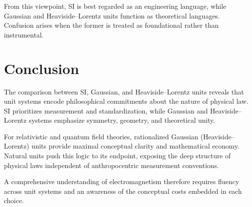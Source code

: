 \documentclass[12pt]{article}
\begin{document}
From this viewpoint, SI is best regarded as an engineering language, while Gaussian and Heaviside–Lorentz units function as theoretical languages. Confusion arises when the former is treated as foundational rather than instrumental.

\section{Conclusion}

The comparison between SI, Gaussian, and Heaviside–Lorentz units reveals that unit systems encode philosophical commitments about the nature of physical law. SI prioritizes measurement and standardization, while Gaussian and Heaviside–Lorentz systems emphasize symmetry, geometry, and theoretical unity.

For relativistic and quantum field theories, rationalized Gaussian (Heaviside–Lorentz) units provide maximal conceptual clarity and mathematical economy. Natural units push this logic to its endpoint, exposing the deep structure of physical laws independent of anthropocentric measurement conventions.

A comprehensive understanding of electromagnetism therefore requires fluency across unit systems and an awareness of the conceptual costs embedded in each choice.
\end{document}
